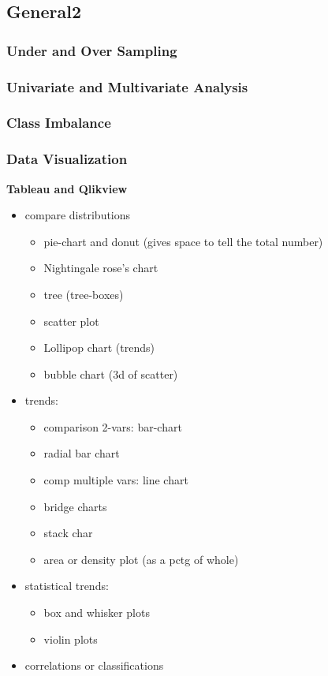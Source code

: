 \documentclass{beamer}
\begin{document}
\subsection{General2}

\begin{frame}\frametitle{Under and Over Sampling}
\end{frame}

\begin{frame}\frametitle{Univariate and Multivariate Analysis}
\end{frame}


\begin{frame}\frametitle{Class Imbalance}
\end{frame}


\begin{frame}[allowframebreaks]\frametitle{Data Visualization}
	\textbf{Tableau and Qlikview}\\
	\begin{itemize}
		\item compare distributions
		\begin{itemize}
			\item pie-chart and donut (gives space to tell the total number)
			\item Nightingale rose's chart
			\item tree (tree-boxes)
			\item scatter plot
			\item Lollipop chart (trends)
			\item bubble chart (3d of scatter)
		\end{itemize}
		\item trends:
		\begin{itemize}
			\item comparison 2-vars: bar-chart
			\item radial bar chart
			\item comp multiple vars: line chart
			\item bridge charts
			\item stack char
			\item area or density plot (as a pctg of whole)  
		\end{itemize}
		\item statistical trends:
		\begin{itemize}
			\item box and whisker plots
			\item violin plots
		\end{itemize}
		\item correlations or classifications

\end{itemize}
\end{frame}
\end{document}
